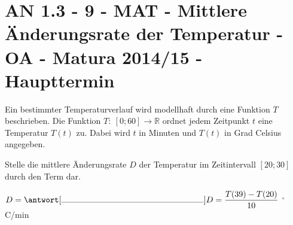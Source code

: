 \section{AN 1.3 - 9 - MAT - Mittlere Änderungsrate der Temperatur - OA - Matura 2014/15 - Haupttermin}

\begin{beispiel}[AN 1.3]{1} %
Ein bestimmter Temperaturverlauf wird modellhaft durch eine Funktion $T$ beschrieben.
Die Funktion $T:~[0; 60] \rightarrow \mathbb{R}$ ordnet jedem Zeitpunkt $t$ eine Temperatur $T(t)$ zu. Dabei wird $t$ in Minuten und $T(t)$ in Grad Celsius angegeben. \leer

Stelle die mittlere Änderungsrate $D$ der Temperatur im Zeitintervall $[20;30]$ durch den Term dar. \leer

$D= \antwort[\rule{6cm}{0.3pt}]{D=\dfrac{T(39)-T(20)}{10}}$ $^\circ$\,C/min
\end{beispiel}